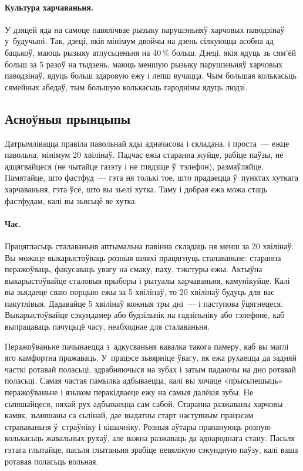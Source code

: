 \paragraph{Культура харчаваньня.}
У дзяцей яда на самоце павялічвае рызыку парушэньняў харчовых паводзінаў у~будучыні. Так, дзеці, якія мінімум двойчы на дзень сілкуюцца асобна ад бацькоў, маюць рызыку атлусьценьня на 40\,\% больш. Дзеці, якія ядуць зь сям'ёй больш за 5 разоў на тыдзень, маюць меншую рызыку парушэньняў харчовых паводзінаў, ядуць больш здаровую ежу і лепш вучацца. Чым большая колькасьць сямейных абедаў, тым большую колькасьць гародніны ядуць людзі.

\subsection{Асноўныя прынцыпы}

Датрымлівацца правіла павольнай яды адначасова і складана, і проста~--- ежце павольна, мінімум 20 хвілінаў. Падчас ежы старанна жуйце, рабіце паўзы, не адцягвайцеся (не чытайце газэту і не глядзіце ў~тэлефон), размаўляйце. Памятайце, што фастфуд~--- гэта ня толькі тое, што прадаецца ў~пунктах хуткага харчаваньня, гэта ўсё, што вы зьелі хутка. Таму і добрая ежа можа стаць фастфудам, калі вы зьясьцё яе хутка.


\paragraph{Час.}
Працягласьць сталаваньня аптымальна павінна складаць ня менш за 20 хвілінаў. Вы можаце выкарыстоўваць розныя шляхі працягнуць сталаваньне: старанна перажоўваць, факусаваць увагу на смаку, паху, тэкстуры ежы. Актыўна выкарыстоўвайце сталовыя прыборы і рытуалы харчаваньня, камунікуйце. Калі вы зьядаеце сваю порцыю ежы за 5 хвілінаў, то 20 хвілінаў будуць для вас пакутлівыя. Дадавайце 5 хвілінаў кожныя тры дні~--- і паступова ўцягнецеся. Выкарыстоўвайце сэкундамер або будзільнік на гадзіньніку або тэлефоне, каб выпрацаваць пачуцьцё часу, неабходнае для сталаваньня.

Перажоўваньне пачынаецца з~адкусваньня кавалка такога памеру, каб вы маглі яго камфортна пражаваць. У~працэсе зьвярніце ўвагу, як ежа рухаецца да задняй часткі ротавай поласьці, здрабняючыся на зубах і затым падаючы на дно ротавай поласьці. Самая частая памылка адбываецца, калі вы хочаце «прысьпешыць» перажоўваньне і языком перакідваеце ежу на самыя далёкія зубы. Не сьпяшайцеся, няхай рух адбываецца сам сабой. Старанна разжаваны харчовы камяк, зьмяшаны са сьлінай, дае выдатны старт наступным працэсам страваваньня ў~страўніку і кішачніку. Розныя аўтары прапануюць розную колькасьць жавальных рухаў, але важна разжаваць да аднароднага стану. Пасьля гэтага глытайце, пасьля глытаньня зрабіце невялікую сэкундную паўзу, калі ваша ротавая поласьць вольная.

